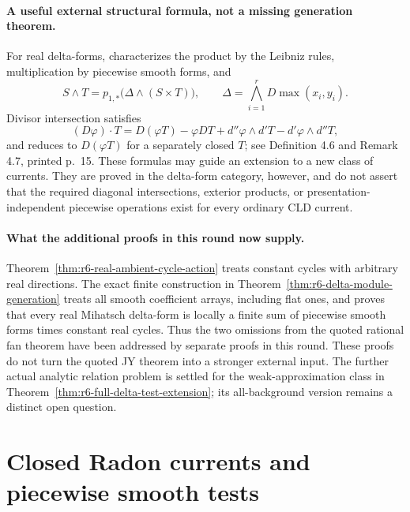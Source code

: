\documentclass[11pt,a4paper]{article}
\numberwithin{equation}{section}
\theoremstyle{definition}
\theoremstyle{remark}
\begin{document}
\paragraph{A useful external structural formula, not a missing generation theorem.}
For real delta-forms, \cite[Theorem 4.1 and its uniqueness proof,
printed pp.~13--14]{Mih23} characterizes the product by the
Leibniz rules, multiplication by piecewise smooth forms, and
\[
 S\wedge T=p_{1,*}\bigl(\Delta\wedge(S\times T)\bigr),\qquad
 \Delta=\bigwedge_{i=1}^rD\max(x_i,y_i).
\]
Divisor intersection satisfies
\[
 (D\varphi)\cdot T
   =D(\varphi T)-\varphi DT+d''\varphi\wedge d'T
                                -d'\varphi\wedge d''T,
\]
and reduces to $D(\varphi T)$ for a separately closed $T$;
see Definition 4.6 and Remark 4.7, printed p.~15.
These formulas may guide an extension to a new class of currents.
They are proved in the delta-form category, however, and do not
assert that the required diagonal intersections, exterior products,
or presentation-independent piecewise operations exist for every
ordinary CLD current.

\paragraph{What the additional proofs in this round now supply.}
Theorem~\ref{thm:r6-real-ambient-cycle-action} treats constant cycles
with arbitrary real directions.  The exact finite construction in
Theorem~\ref{thm:r6-delta-module-generation} treats all smooth
coefficient arrays, including flat ones, and proves that every real
Mihatsch delta-form is locally a finite sum of piecewise smooth forms
times constant real cycles.  Thus the two omissions from the quoted
rational fan theorem have been addressed by separate proofs in this
round.  These proofs do not turn the quoted JY theorem into a stronger
external input.  The further actual analytic relation problem is
settled for the weak-approximation class in
Theorem~\ref{thm:r6-full-delta-test-extension}; its all-background
version remains a distinct open question.



\section{Closed Radon currents and piecewise smooth tests}
\label{sec:r6-pws-tangent-extension}
\end{document}
